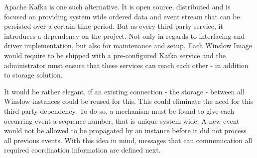 Apache Kafka\cite{kafka} is one such alternative.
It is open source, distributed and is focused on providing system wide ordered data and event stream that can be persisted over a certain time period.
But as every third party service, it introduces a dependency on the project.
Not only in regards to interfacing and driver implementation, but also for maintenance and setup.
Each Winslow Image would require to be shipped with a pre-configured Kafka service and the administrator must ensure that these services can reach each other - in addition to storage solution.

It would be rather elegant, if an existing connection - the storage - between all Winslow instances could be reused for this.
This could eliminate the need for this third party dependency.
To do so, a mechanism must be found to give each occurring event a sequence number, that is unique system wide.
A new event would not be allowed to be propagated by an instance before it did not process all previous events.
With this idea in mind, messages that can communication all required coordination information are defined  next.

